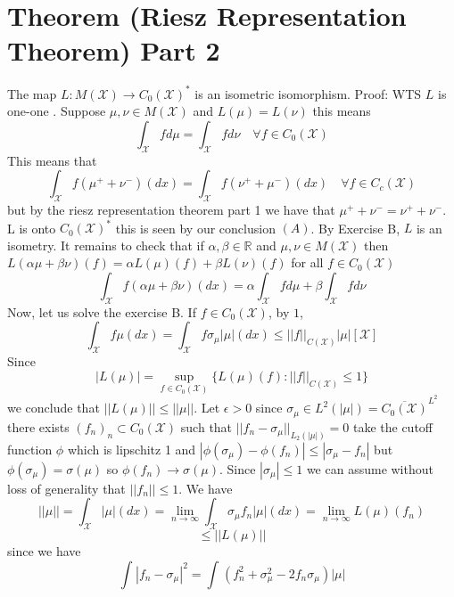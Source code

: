 \documentclass[11pt]{article}
\begin{document}
\section{Theorem (Riesz Representation Theorem) Part 2}
The map $L : M( \mathcal{X}) \to C_0( \mathcal{X})^{*}$ is an isometric isomorphism.
Proof:
WTS $L $ is one-one . Suppose  $\mu,\nu  \in M( \mathcal{X})$ and $L(\mu) = L(\nu)$ this means
\[
\int_{ \mathcal{X}}^{}f d\mu = \int_{ \mathcal{X}}^{}f d\nu \quad \forall f \in C_0( \mathcal{X})
\] 
This means that
\[
\int_{ \mathcal{X}}^{}f (\mu^{+} + \nu^{-})(dx) = \int_{ \mathcal{X}}^{}f(\nu^{+} + \mu^{-})(dx) \quad \forall f \in C_c( \mathcal{X})
\] 
but by the riesz representation theorem part 1 we have that $\mu^{+} + \nu^{-} = \nu^{+} + \nu^{-}$.
L is onto $C_0( \mathcal{X})^{*}$ this is seen by our conclusion $(A)$.
By Exercise B, $L$ is an isometry. It remains to check that if  $\alpha, \beta \in \mathbb{R}$
and $\mu,\nu \in M( \mathcal{X})$ then $L(\alpha \mu + \beta \nu)(f) = \alpha L(\mu)(f) + \beta L(\nu)(f)$ for all $f \in C_0( \mathcal{X})$
\[
\int_{ \mathcal{X}}^{}f(\alpha \mu + \beta \nu)(dx) = \alpha \int_{ \mathcal{X}}^{}f d\mu + \beta \int_{ \mathcal{X}}^{}fd\nu
\] 
Now, let us solve the exercise B.
If $f \in C_0( \mathcal{X})$, by $1$, 
 \[
     \int_{ \mathcal{X}}^{}f \mu(dx) = \int_{ \mathcal{X}}^{}f \sigma_\mu |\mu|(dx) \le ||f||_{C( \mathcal{X})} |\mu|[ \mathcal{X}]
\] 
Since
\[
    |L(\mu)| = \sup_{f \in C_0 ( \mathcal{X})} \{L(\mu)(f): ||f||_{ C( \mathcal{X})} \le 1\}
\] 
we conclude that $||L(\mu)|| \le ||\mu||$. 
Let $\epsilon > 0$ since $\sigma_\mu \in L^2(|\mu|) = \overline{C_0( \mathcal{X})}^{L^{2}}$ there exists $(f_n)_n \subset C_0 ( \mathcal{X})$ such that
$||f_n - \sigma_\mu||_{L_2(|\mu|)} = 0$ take the cutoff function $\phi$ which is lipschitz 1 and $|\phi( \sigma_\mu) - \phi(f_n)| \le |\sigma_\mu - f_n|$ but $\phi(\sigma_\mu) = \sigma(\mu)$ so $\phi(f_n) \to \sigma(\mu)$.
Since $| \sigma_\mu| \le 1$ we can assume without loss of generality that $||f_n|| \le 1$.
We have
\[
||\mu|| = \int_{ \mathcal{X}}^{}|\mu|(dx) = \lim_{n\to \infty} \int_{ \mathcal{X}}^{}\sigma_\mu f_n |\mu|(dx) = \lim_{n\to \infty}L(\mu)(f_n)
\] 
\[
\le ||L(\mu)||
\] 
since we have
\[
\int_{}^{}|f_n - \sigma_\mu|^2 = \int_{}^{}(f_n^2 + \sigma_\mu^2 - 2 f_n\sigma_\mu) |\mu|
\] 
\end{document}
